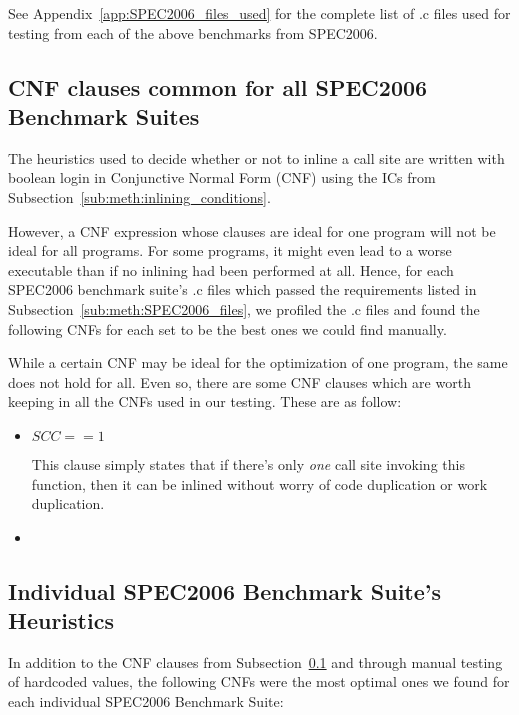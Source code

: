See Appendix~\ref{app:SPEC2006_files_used} for the complete list of .c files
used for testing from each of the above benchmarks from SPEC2006.

\subsection{CNF clauses common for all SPEC2006 Benchmark Suites}
\label{sub:meth:comon_CNFs}

The heuristics used to decide whether or not to inline a call site are written
with boolean login in Conjunctive Normal Form (CNF) using the ICs from
Subsection~\ref{sub:meth:inlining_conditions}.

However, a CNF expression whose clauses are ideal for one program will not be
ideal for all programs. For some programs, it might even lead to a worse
executable than if no inlining had been performed at all. Hence, for each
SPEC2006 benchmark suite's .c files which passed the requirements listed in
Subsection~\ref{sub:meth:SPEC2006_files}, we profiled the .c files and found the
following CNFs for each set to be the best ones we could find manually.

While a certain CNF may be ideal for the optimization of one program, the same
does not hold for all. Even so, there are some CNF clauses which are worth
keeping in all the CNFs used in our testing. These are as follow:

\begin{itemize}
	\item $SCC == 1$

This clause simply states that if there's only \textit{one} call site invoking
this function, then it can be inlined without worry of code duplication or work
duplication.

	\item {}
\end{itemize}

\subsection{Individual SPEC2006 Benchmark Suite's Heuristics}
\label{sub:meth:SPEC2006_heuristics}

In addition to the CNF clauses from Subsection~\ref{sub:meth:comon_CNFs} and
through manual testing of hardcoded values, the following CNFs were the most
optimal ones we found for each individual SPEC2006 Benchmark Suite:

